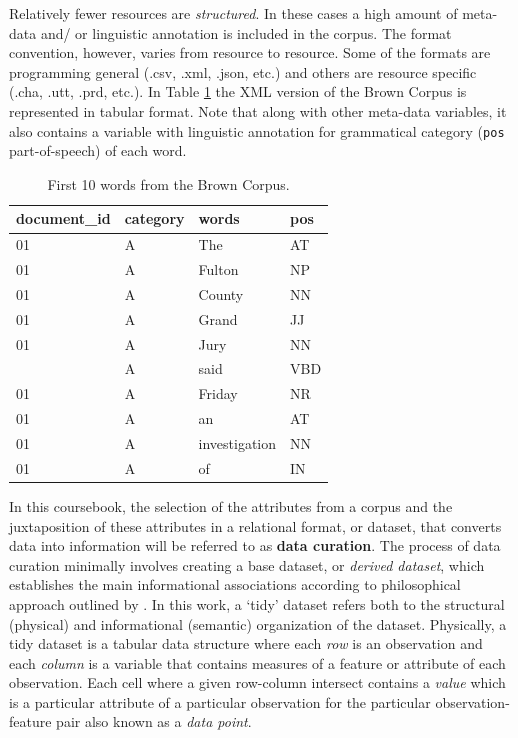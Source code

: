 \documentclass[
]{article}
\begin{document}
Relatively fewer resources are \emph{structured}. In these cases a high amount of meta-data and/ or linguistic annotation is included in the corpus. The format convention, however, varies from resource to resource. Some of the formats are programming general (.csv, .xml, .json, etc.) and others are resource specific (.cha, .utt, .prd, etc.). In Table \ref{tab:structure-brown} the XML version of the Brown Corpus is represented in tabular format. Note that along with other meta-data variables, it also contains a variable with linguistic annotation for grammatical category (\texttt{pos} part-of-speech) of each word.

\begin{table}

\caption{\label{tab:structure-brown}First 10 words from the Brown Corpus.}
\centering
\begin{tabular}[t]{llll}
\toprule
document\_id & category & words & pos\\
\midrule
01 & A & The & AT\\
01 & A & Fulton & NP\\
01 & A & County & NN\\
01 & A & Grand & JJ\\
01 & A & Jury & NN\\
\addlinespace
01 & A & said & VBD\\
01 & A & Friday & NR\\
01 & A & an & AT\\
01 & A & investigation & NN\\
01 & A & of & IN\\
\bottomrule
\end{tabular}
\end{table}

In this coursebook, the selection of the attributes from a corpus and the juxtaposition of these attributes in a relational format, or dataset, that converts data into information will be referred to as \textbf{data curation}. The process of data curation minimally involves creating a base dataset, or \emph{derived dataset}, which establishes the main informational associations according to philosophical approach outlined by \citet{Wickham2014a}. In this work, a `tidy' dataset refers both to the structural (physical) and informational (semantic) organization of the dataset. Physically, a tidy dataset is a tabular data structure where each \emph{row} is an observation and each \emph{column} is a variable that contains measures of a feature or attribute of each observation. Each cell where a given row-column intersect contains a \emph{value} which is a particular attribute of a particular observation for the particular observation-feature pair also known as a \emph{data point}.
\end{document}
